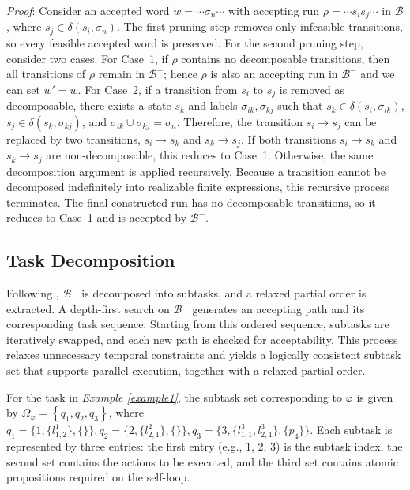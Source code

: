 \documentclass[lettersize,journal]{IEEEtran}
\begin{document}
\textit{Proof}: Consider an accepted word $w = \cdots \sigma_n \cdots$ with accepting run $\rho = \cdots s_i s_j \cdots$ in $\mathcal{B}$, where $s_j \in \delta(s_i,\sigma_n)$. The first pruning step removes only infeasible transitions, so every feasible accepted word is preserved. For the second pruning step, consider two cases.
For Case~1, if $\rho$ contains no decomposable transitions, then all transitions of $\rho$ remain in $\mathcal{B}^{-}$; hence $\rho$ is also an accepting run in $\mathcal{B}^{-}$ and we can set $w' = w$.
For Case~2, if a transition from $s_i$ to $s_j$ is removed as decomposable, there exists a state $s_k$ and labels $\sigma_{ik}, \sigma_{kj}$ such that $s_k \in \delta(s_i,\sigma_{ik})$, $s_j \in \delta(s_k,\sigma_{kj})$, and $\sigma_{ik} \cup \sigma_{kj} = \sigma_n$. Therefore, the transition $s_i \to s_j$ can be replaced by two transitions, $s_i \to s_k$ and $s_k \to s_j$. If both transitions $s_i \to s_k$ and $s_k \to s_j$ are non-decomposable, this reduces to Case~1. Otherwise, the same decomposition argument is applied recursively.
Because a transition cannot be decomposed indefinitely into realizable finite expressions, this recursive process terminates. The final constructed run has no decomposable transitions, so it reduces to Case~1 and is accepted by $\mathcal{B}^{-}$.

\subsection{Task Decomposition}
Following \cite{liu2024time}, $\mathcal{B}^-$ is decomposed into subtasks, and a relaxed partial order is extracted. A depth-first search on $\mathcal{B}^-$ generates an accepting path and its corresponding task sequence. Starting from this ordered sequence, subtasks are iteratively swapped, and each new path is checked for acceptability. This process relaxes unnecessary temporal constraints and yields a logically consistent subtask set that supports parallel execution, together with a relaxed partial order.

\begin{example}
  For the task in \textit{Example \ref{example1}}, the subtask set corresponding to $\varphi$ is given by $\Omega_{\varphi} = \left\{q_1, q_2, q_3\right\}$, where $q_1 = \{ 1, \{l^1_{1,2}\}, \{\}\}, q_2 = \{2, \{l^2_{2,1}\}, \{\}\}, q_3 = \{3,\{l^3_{1,1}, l^3_{2,1}\}, \{p_4\}\}$. Each subtask is represented by three entries: the first entry (e.g., 1, 2, 3) is the subtask index, the second set contains the actions to be executed, and the third set contains atomic propositions required on the self-loop.
\end{example}
\end{document}
